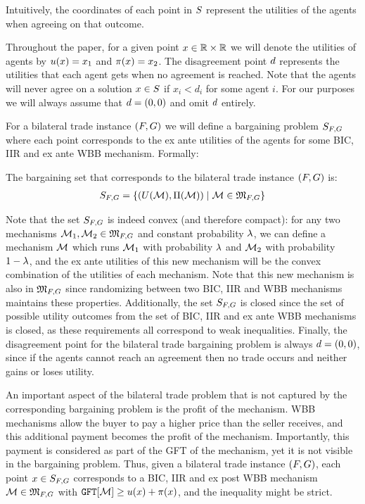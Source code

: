 Intuitively, the coordinates of each point in $S$ represent the utilities of the agents when agreeing on that outcome. {Throughout the paper, for a given point $x\in \mathbb{R}\times\mathbb{R}$ we will denote the utilities of agents by $u(x)=x_1$ and $\pi(x)=x_2$. The disagreement point $d$ represents the utilities that each agent gets when no agreement is reached. Note that the agents will never agree on a solution $x\in S$ if $x_i < d_i$ for some agent $i$. For our purposes we will always assume that $d=(0,0)$ and omit $d$ entirely.

For a bilateral trade instance $(F,G)$ we will define a bargaining problem $S_{F,G}$ where each point corresponds to the ex ante utilities of the agents for some BIC, IIR and ex ante WBB mechanism. Formally:
\begin{definition}  
The bargaining set that corresponds to the bilateral trade instance $(F,G)$ is:
\begin{align*}
    S_{F,G}=\left\{(U(\mathcal{M}),\Pi(\mathcal{M})) \mid \mathcal{M} \in \mathfrak{M}_{F,G}\right\}
\end{align*}
\end{definition}


Note that the set $S_{F,G}$ is indeed convex (and therefore compact): for any two mechanisms $\mathcal{M}_1,\mathcal{M}_2\in \mathfrak{M}_{F,G}$ and constant probability $\lambda$, we can define a mechanism $\mathcal{M}$ which runs $\mathcal{M}_1$ with probability $\lambda$ and $\mathcal{M}_2$ with probability $1-\lambda$, and the ex ante utilities of this new mechanism will be the convex combination of the utilities of each mechanism. Note that this new mechanism is also in $\mathfrak{M}_{F,G}$ since randomizing between two BIC, IIR and WBB mechanisms maintains these properties. Additionally, the set $S_{F,G}$ is closed since the set of possible utility outcomes from the set of BIC, IIR and ex ante WBB mechanisms is closed, as these requirements all correspond to weak inequalities. Finally, the disagreement point for the bilateral trade bargaining problem is always $d=(0,0)$, since if the agents cannot reach an agreement then no trade occurs and neither gains or loses utility.


An important aspect of the bilateral trade problem that is not captured by the corresponding bargaining problem is the profit of the mechanism. WBB mechanisms allow the buyer to pay a higher price than the seller receives, and this additional payment becomes the profit of the mechanism. Importantly, this payment is considered as part of the GFT of the mechanism, yet it is not visible in the bargaining problem. Thus, given a bilateral trade instance $(F,G)$, each point $x\in S_{F,G}$ corresponds to a BIC, IIR and ex post WBB mechanism $\mathcal{M}\in\mathfrak{M}_{F,G}$ with $\GFT{\mech} \geq \buyercoord{\pnta}+\sellercoord{\pnta}$, {and the inequality might be strict}. 

}
